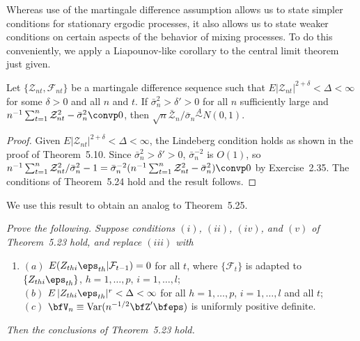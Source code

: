 Whereas use of the martingale difference assumption allows us to state simpler conditions for stationary ergodic processes, it also allows us to state weaker conditions on certain aspects of the behavior of mixing processes. To do this conveniently, we apply a Liapounov-like corollary to the central limit theorem just given.

\begin{corollary}\label{cor:mds-liapounov}
Let $\{\mathcal{Z}_{nt}, \mathcal{F}_{nt}\}$ be a martingale difference sequence such that $E|\mathcal{Z}_{nt}|^{2+\delta} < \Delta < \infty$ for some $\delta > 0$ and all $n$ and $t$. If $\bar{\sigma}_n^2 > \delta' > 0$ for all $n$ sufficiently large and $n^{-1}\sum_{t=1}^{n}\mathcal{Z}_{nt}^2 - \bar{\sigma}_n^2 \convp 0$, then $\sqrt{n}\bar{\mathcal{Z}}_n/\bar{\sigma}_n \overset{A}{\sim} N(0,1)$.
\end{corollary}

\begin{proof}
Given $E|\mathcal{Z}_{nt}|^{2+\delta} < \Delta < \infty$, the Lindeberg condition holds as shown in the proof of Theorem~5.10. Since $\bar{\sigma}_n^2 > \delta' > 0$, $\bar{\sigma}_n^{-2}$ is $O(1)$, so $n^{-1}\sum_{t=1}^{n}\mathcal{Z}_{nt}^2/\bar{\sigma}_n^2 - 1 = \bar{\sigma}_n^{-2}(n^{-1}\sum_{t=1}^{n}\mathcal{Z}_{nt}^2 - \bar{\sigma}_n^2) \convp 0$ by Exercise~2.35. The conditions of Theorem~5.24 hold and the result follows.
\end{proof}

We use this result to obtain an analog to Theorem~5.25.

\begin{exercises}

\item\label{ex:iv-mds-mixing} \textit{Prove the following. Suppose conditions $(i)$, $(ii)$, $(iv)$, and $(v)$ of Theorem~5.23 hold, and replace $(iii)$ with}
\begin{enumerate}
\item[$(iii')$] $(a)$ $E(Z_{thi}\eps_{th}|\mathcal{F}_{t-1}) = 0$ for all $t$, where $\{\mathcal{F}_t\}$ is adapted to $\{Z_{thi}\eps_{th}\}$, $h = 1, \ldots, p$, $i = 1, \ldots, l$;\\
$(b)$ $E\,|Z_{thi}\eps_{th}|^r < \Delta < \infty$ for all $h = 1, \ldots, p$, $i = 1, \ldots, l$ and all $t$;\\
$(c)$ $\bfV_n \equiv \Var(n^{-1/2}\bfZ'\bfeps)$ is uniformly positive definite.
\end{enumerate}

\textit{Then the conclusions of Theorem~5.23 hold.}

\end{exercises}

